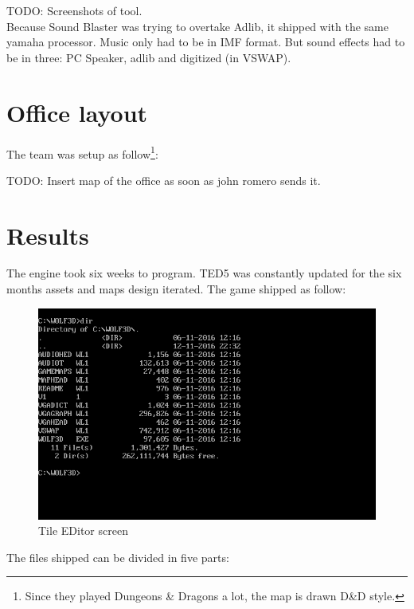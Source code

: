 \documentclass[book.tex]{subfiles}
\begin{document}
TODO: Screenshots of tool.\\
Because Sound Blaster was trying to overtake Adlib, it shipped with the same yamaha processor. Music only had to be in IMF format. But sound effects had to be in three: PC Speaker, adlib and digitized (in VSWAP).


\section{Office layout}
The team was setup as follow\footnote{Since they played Dungeons \& Dragons a lot, the map is drawn D\&D style.}:
\par
TODO: Insert map of the office as soon as john romero sends it.


\section{Results}
The engine took six weeks to program. TED5 was constantly updated for the six months assets and maps design iterated. The game shipped as follow:
 \begin{figure}[H]
\centering
 \includegraphics[width=\textwidth]{imgs/result.png}
 \caption{Tile EDitor screen} 
  \end{figure}
  \par
 The files shipped can be divided in five parts:
\end{document}
